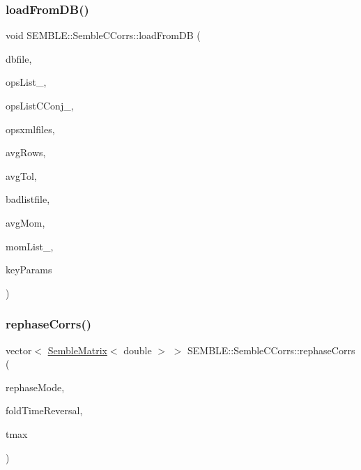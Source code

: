 \subsubsection{\texorpdfstring{loadFromDB()}{loadFromDB()}\hspace{0.1cm}{\footnotesize\ttfamily [2/2]}}
{\footnotesize\ttfamily void S\+E\+M\+B\+L\+E\+::\+Semble\+C\+Corrs\+::load\+From\+DB (\begin{DoxyParamCaption}\item[{const string \&}]{dbfile,  }\item[{vector$<$ string $>$}]{ops\+List\+\_\+,  }\item[{vector$<$ int $>$}]{ops\+List\+C\+Conj\+\_\+,  }\item[{const Array$<$ string $>$ \&}]{opsxmlfiles,  }\item[{Array$<$ int $>$}]{avg\+Rows,  }\item[{double}]{avg\+Tol,  }\item[{const string \&}]{badlistfile,  }\item[{bool}]{avg\+Mom,  }\item[{vector$<$ Array$<$ int $>$ $>$}]{mom\+List\+\_\+,  }\item[{Input\+Props\+Redstar\+Keys\+\_\+t}]{key\+Params }\end{DoxyParamCaption})}

\mbox{\label{classSEMBLE_1_1SembleCCorrs_a8a6ab4bd80f866d566c8a62ec53d5a53}} 
\subsubsection{\texorpdfstring{rephaseCorrs()}{rephaseCorrs()}}
{\footnotesize\ttfamily vector$<$ \mbox{\hyperlink{structSEMBLE_1_1SembleMatrix}{Semble\+Matrix}}$<$ double $>$ $>$ S\+E\+M\+B\+L\+E\+::\+Semble\+C\+Corrs\+::rephase\+Corrs (\begin{DoxyParamCaption}\item[{const string \&}]{rephase\+Mode,  }\item[{const string \&}]{fold\+Time\+Reversal,  }\item[{int}]{tmax }\end{DoxyParamCaption})}

